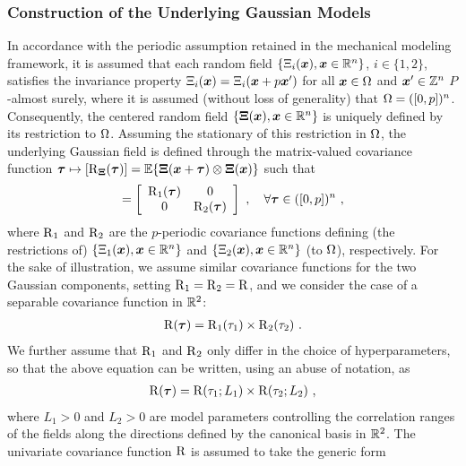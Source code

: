\subsubsection{Construction of the Underlying Gaussian Models}

In accordance with the periodic assumption retained in the mechanical modeling framework, it is assumed that each random field $\{\Xi_i(\boldsymbol{x}), \boldsymbol{x} \in \mathbb{R}^n\}$, $i \in \{1,2\}$, satisfies the invariance property $\Xi_i(\boldsymbol{x}) = \Xi_i(\boldsymbol{x}+p\boldsymbol{x}')$ for all $\boldsymbol{x} \in \Omega$ and $\boldsymbol{x}' \in \mathbb{Z}^n$
$P$-almost surely, where it is assumed (without loss of generality) that $\Omega = ([0,p])^n$. Consequently, the centered random field $\{\boldsymbol{\Xi}(\boldsymbol{x}), \boldsymbol{x} \in \mathbb{R}^n\}$ is uniquely defined by its restriction to $\Omega$.  Assuming the stationary of this restriction in $\Omega$, the underlying Gaussian field is defined through the matrix-valued covariance function $\boldsymbol{\tau} \mapsto [\operatorname{R}_{\boldsymbol{\Xi}}(\boldsymbol{\tau})] = \mathbb{E}\{\boldsymbol{\Xi}(\boldsymbol{x}+\boldsymbol{\tau}) \otimes \boldsymbol{\Xi}(\boldsymbol{x})\}$
such that
\begin{align}
  [\cor_{\bs{\Xi}}(\bs{\tau})] = \left[\begin{array}{cc}\cor_1(\bs{\tau}) & 0 \\0 & \cor_2(\bs{\tau}) \end{array}\right]~, \quad \forall \bs{\tau} \in ([0,p])^n~,
\end{align}
where $\operatorname{R}_1$ and $\operatorname{R}_2$ are the $p$-periodic covariance functions defining (the restrictions of) $\{\Xi_1(\boldsymbol{x}), \boldsymbol{x} \in \mathbb{R}^n\}$ and $\{\Xi_2(\boldsymbol{x}), \boldsymbol{x} \in \mathbb{R}^n\}$ (to $\Omega$), respectively.
For the sake of illustration, we assume similar covariance functions for the two Gaussian components, setting $\operatorname{R}_1 = \operatorname{R}_2 = \operatorname{R}$,
and we consider the case of a separable covariance function in $\mathbb{R}^2$:
\begin{align}
  \operatorname{R}(\boldsymbol{\tau}) = \operatorname{R}_1(\tau_1) \times \operatorname{R}_2(\tau_2)~. \label{eq: composite covariance function}
\end{align}
We further assume that $\operatorname{R}_1$ and $\operatorname{R}_2$ only differ in the choice of hyperparameters, so that the above equation can be written, using an abuse of notation, as
\begin{align}
  \operatorname{R}(\boldsymbol{\tau}) = \operatorname{R}(\tau_1;L_1) \times \operatorname{R}(\tau_2;L_2)~,
\end{align}
where $L_1 > 0$ and $L_2 > 0$ are model parameters controlling the correlation ranges of the fields along the directions defined by the canonical basis in $\mathbb{R}^2$. The univariate covariance function $\operatorname{R}$ is assumed to take the generic form

